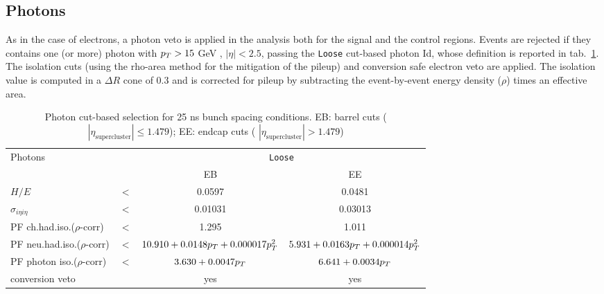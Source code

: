 
\subsection{Photons}
As in the case of electrons, a photon veto is applied in the analysis both for the signal and the control regions. Events are rejected if they contains one (or more) photon with $p_T > 15$ GeV , $|\eta| < 2.5$, passing the \texttt{Loose} cut-based photon Id, whose definition is reported in tab.~\ref{tab:PhotonId}. The isolation cuts (using the rho-area method for the mitigation of the pileup) and conversion safe electron veto are applied. The isolation value is computed in a $\Delta R$ cone of 0.3 and is corrected for pileup by subtracting the event-by-event energy density ($\rho$) times an effective area.

 \begin{table}[htb]
  \centering
     \begin{tabular}{lccc}
      \hline
 
     Photons                                   &       & \multicolumn{2}{c}{\texttt{Loose}}\\
                                               &       & EB      & EE  \\
  \hline
     $H/E $                                    & $ < $ &0.0597   & 0.0481      \\
     $\sigma_{i\eta i\eta} $                   & $ < $ &0.01031  & 0.03013   \\
     PF ch.had.iso.($\rho$-corr)               & $ < $ &1.295    & 1.011   \\
     PF neu.had.iso.($\rho$-corr)              & $ < $ &$10.910+0.0148p_T+0.000017p_T^2$    &$5.931+0.0163p_T+0.000014p_T^2 $   \\
     PF photon iso.($\rho$-corr)               & $ < $ &$3.630+0.0047p_T$                 &$6.641+0.0034p_T $   \\
     conversion veto                           &       & yes     &yes     \\
  \hline
 \end{tabular}
  \caption{Photon cut-based selection for 25 ns bunch spacing conditions. EB: barrel cuts ( $|\eta_\text{supercluster}| \leq 1.479$); EE: endcap cuts ( $|\eta_\text{supercluster}| > 1.479$)}\label{tab:PhotonId}
 \end{table}

